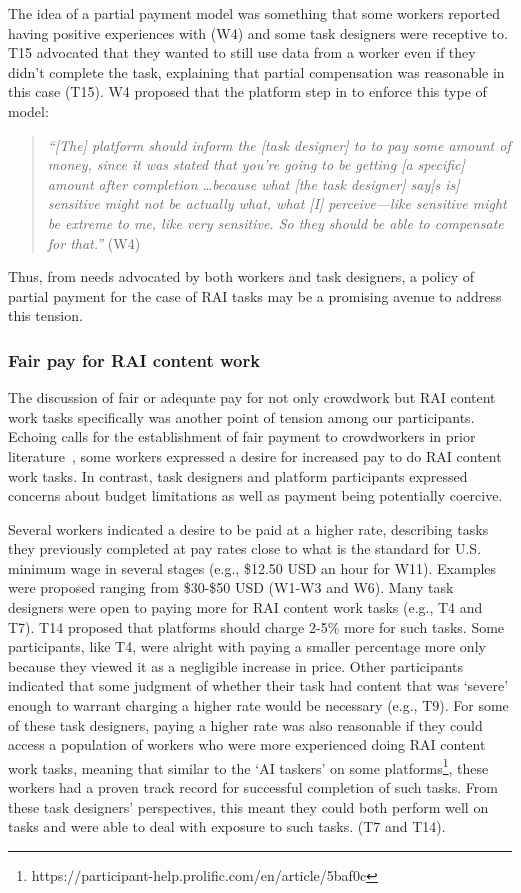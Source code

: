 The idea of a partial payment model was something that some workers reported having positive experiences with (W4) and some task designers were receptive to. T15 advocated that they wanted to still use data from a worker even if they didn't complete the task, explaining that partial compensation was reasonable in this case (T15). W4 proposed that the platform step in to enforce this type of model:
\begin{quote}
    \textit{``[The] platform should inform the [task designer] to to pay some amount of money, since it was stated that you're going to be getting [a specific] amount after completion \dots  because what [the task designer] say[s is] sensitive might not be actually what, what [I] perceive---like sensitive might be extreme to me, like very sensitive. So they should be able to compensate for that.''} (W4)
\end{quote}
Thus, from needs advocated by both workers and task designers, a policy of partial payment for the case of RAI tasks may be a promising avenue to address this tension. 

\subsubsection{Fair pay for RAI content work}
The discussion of fair or adequate pay for not only crowdwork but RAI content work tasks specifically was another point of tension among our participants. Echoing calls for the establishment of fair payment to crowdworkers in prior literature~\cite{silberman2018responsible, irani2013turkopticon}, some workers expressed a desire for increased pay to do RAI content work tasks. In contrast, task designers and platform participants expressed concerns about budget limitations as well as payment being potentially coercive. 

Several workers indicated a desire to be paid at a higher rate, describing tasks they previously completed at pay rates close to what is the standard for U.S. minimum wage in several stages (e.g., \$12.50 USD an hour for W11). Examples were proposed ranging from \$30-\$50 USD (W1-W3 and W6). Many task designers were open to paying more for RAI content work tasks (e.g., T4 and T7). T14 proposed that platforms should charge 2-5\% more for such tasks. Some participants, like T4, were alright with paying a smaller percentage more only because they viewed it as a negligible increase in price. Other participants indicated that some judgment of whether their task had content that was `severe' enough to warrant charging a higher rate would be necessary (e.g., T9). For some of these task designers, paying a higher rate was also reasonable if they could access a population of workers who were more experienced doing RAI content work tasks, meaning that similar to the `AI taskers' on some platforms\footnote{https://participant-help.prolific.com/en/article/5baf0c}, these workers had a proven track record for successful completion of such tasks. From these task designers' perspectives, this meant they could both perform well on tasks and were able to deal with exposure to such tasks. (T7 and T14). 

